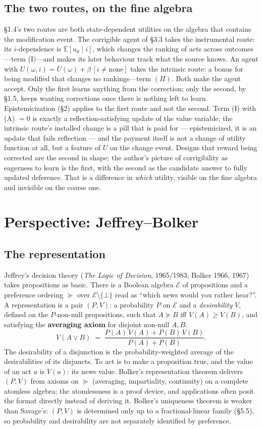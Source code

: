 \documentclass[11pt,a4paper]{article}
\newcommand{\cE}{\mathcal{E}}
\begin{document}
\subsection{The two routes, on the fine algebra}
\S1.4's two routes are both state-dependent utilities on the algebra that contains the modification event. The corrigible agent of \S3.3 takes the instrumental route: its $i$-dependence is $\mathbb E[ u_\theta \mid i]$, which changes the ranking of acts across outcomes---term (I)---and makes its later behaviour track what the source knows. An agent with $U(\omega, i) = \bar U(\omega) + \beta\,[ i \ne \text{none}]$ takes the intrinsic route: a bonus for being modified that changes no rankings---term $(\Pi)$. Both make the agent accept. Only the first learns anything from the correction; only the second, by \S1.5, keeps wanting corrections once there is nothing left to learn. Epistemicization (\S2) applies to the first route and not the second. Term (I) with (A) $= 0$ is exactly a reflection-satisfying update of the value variable; the intrinsic route's installed change is a pill that is paid for --- epistemicized, it is an update that fails reflection --- and the payment itself is not a change of utility function at all, but a feature of $U$ on the change event. Designs that reward being corrected are the second in shape; the author's picture of corrigibility as eagerness to learn is the first, with the second as the candidate answer to fully updated deference. That is a difference in \emph{which} utility, visible on the fine algebra and invisible on the coarse one.

\section{Perspective: Jeffrey--Bolker}

\subsection{The representation}
Jeffrey's decision theory (\emph{The Logic of Decision}, 1965/1983; Bolker 1966, 1967) takes propositions as basic. There is a Boolean algebra $\cE$ of propositions and a preference ordering $\succeq$ over $\cE \setminus \{\bot\}$ read as ``which news would you rather hear?''. A representation is a pair $(P, V)$: a probability $P$ on $\cE$ and a \emph{desirability} $V$, defined on the $P$-non-null propositions, such that $A \succeq B$ iff $V(A) \ge V(B)$, and satisfying the \textbf{averaging axiom} for disjoint non-null $A, B$:
\[
V(A \vee B) \;=\; \frac{P(A)\,V(A) + P(B)\,V(B)}{P(A) + P(B)}.
\]
The desirability of a disjunction is the probability-weighted average of the desirabilities of its disjuncts. To act is to make a proposition true, and the value of an act $a$ is $V(a)$: its news value. Bolker's representation theorem delivers $(P, V)$ from axioms on $\succeq$ (averaging, impartiality, continuity) on a complete atomless algebra; the atomlessness is a proof device, and applications often posit the format directly instead of deriving it. Bolker's uniqueness theorem is weaker than Savage's: $(P, V)$ is determined only up to a fractional-linear family (\S5.5), so probability and desirability are not separately identified by preference.
\end{document}
